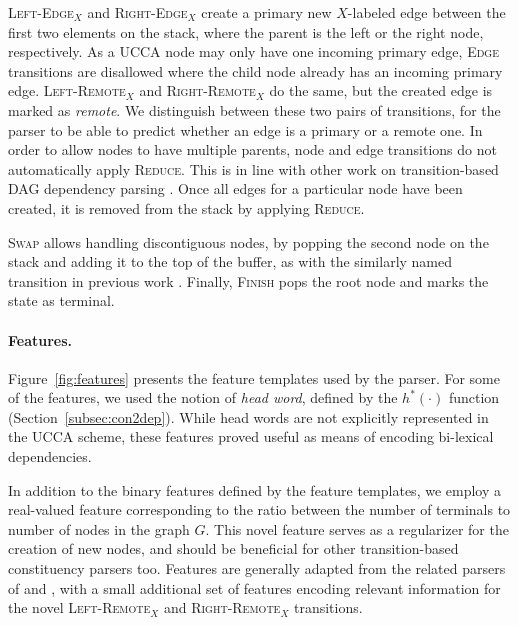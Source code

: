 \documentclass[11pt]{article}
\newcommand{\secref}[1]{Section~\ref{#1}}
\newcommand{\figref}[1]{Figure~\ref{#1}}
\begin{document}
\textsc{Left-Edge$_X$} and \textsc{Right-Edge$_X$} create a primary new $X$-labeled edge between the first two elements on the stack, where the parent is the left or the right node, respectively. As a UCCA node may only
have one incoming primary edge, \textsc{Edge} transitions are disallowed where the child node already
has an incoming primary edge.
\textsc{Left-Remote$_X$} and \textsc{Right-Remote$_X$} do the same, but the created edge is marked as \textit{remote}. We distinguish between these two pairs of transitions, for the parser to be able to predict whether an edge is a primary or a remote one.
In order to allow nodes to have multiple parents, node and edge transitions do not automatically
apply \textsc{Reduce}. This is in line with other work on
transition-based DAG dependency parsing \cite{sagae2008shift,tokgoz2015transition}.
Once all edges for a particular node have been created, it is removed from the stack
by applying \textsc{Reduce}.

\textsc{Swap} allows handling discontiguous nodes, by popping the second
node on the stack and adding it to the top of the buffer, as with the similarly
named transition in previous work \cite{nivre2009non,maier2015discontinuous}.
Finally, \textsc{Finish} pops the root node and marks the state as terminal.

\paragraph{Features.}
\label{subsec:features}

\figref{fig:features} presents the feature templates used by the parser.
For some of the features, we used the notion of \textit{head word},
defined by the $h^*(\cdot)$ function (\secref{subsec:con2dep}).
While head words are not explicitly represented in the UCCA scheme, these
features proved useful as means of encoding bi-lexical dependencies.

In addition to the binary features defined by the feature templates,
we employ a real-valued feature corresponding to the ratio between the number of terminals to number of nodes
in the graph $G$. This novel feature serves as a regularizer for the creation of new nodes, and should be beneficial for other transition-based constituency parsers too.
Features are generally adapted from the related parsers of  and
, with a small additional set of features encoding relevant information
for the novel \textsc{Left-Remote$_X$} and \textsc{Right-Remote$_X$} transitions.
\end{document}
